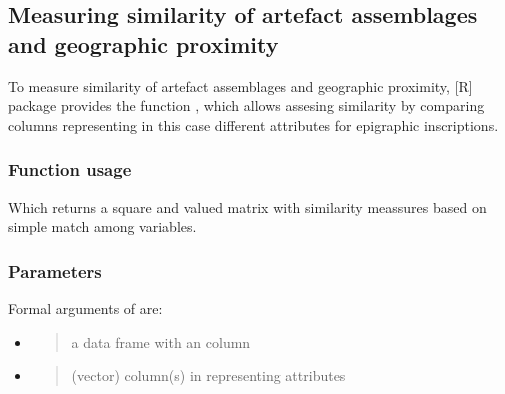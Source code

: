 \documentclass[a4paper,12pt,english]{sphinxhowto}
\begin{document}
\subsection{Measuring similarity of artefact assemblages and geographic proximity}
\label{\detokenize{EpigraphicNetwork:measuring-similarity-of-artefact-assemblages-and-geographic-proximity}}
To measure similarity of artefact assemblages and geographic proximity, {[}R{]} package
 provides the function , which allows assesing similarity by comparing
columns representing \textendash{}in this case\textendash{} different attributes for epigraphic inscriptions.



\subsubsection{Function usage}
\label{\detokenize{EpigraphicNetwork:function-usage}}

\begin{fulllineitems}
\label{\detokenize{EpigraphicNetwork:simil}}
\end{fulllineitems}


\begin{sphinxVerbatim}[commandchars=\\\{\},formatcom=\footnotesize]
     
\end{sphinxVerbatim}

Which returns a square and valued matrix with similarity meassures based on simple match among variables.



\subsubsection{Parameters}
\label{\detokenize{EpigraphicNetwork:parameters}}
Formal arguments of  are:
\begin{itemize}
\item {} 
\begin{quote}

a data frame with an  column
\end{quote}

\item {} 
\begin{quote}

(vector) column(s) in  representing attributes
\end{quote}

\end{itemize}
\end{document}
